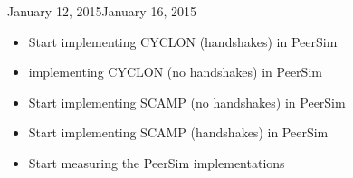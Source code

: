 \documentclass[11pt, english, screen]{report-rd-info}
\begin{document}
\begin{fichesuivi}{January 12, 2015}{January 16, 2015}

   \begin{travaileffectue}
   \begin{itemize}
   \item {Start implementing CYCLON (handshakes) in PeerSim}
   \item {implementing CYCLON (no handshakes) in PeerSim}
      \end{itemize}
   \end{travaileffectue}

   \begin{travailnoneffectue}
   
   \end{travailnoneffectue}

   \begin{echange}
   \begin{itemize}
   \item {Start implementing SCAMP (no handshakes) in PeerSim}
   \item {Start implementing SCAMP (handshakes) in PeerSim}
      \end{itemize}
   \end{echange}

   \begin{planification}
   \begin{itemize}
   \item {Start measuring the PeerSim implementations}
      \end{itemize}
   \end{planification}
\end{fichesuivi}
\end{document}
